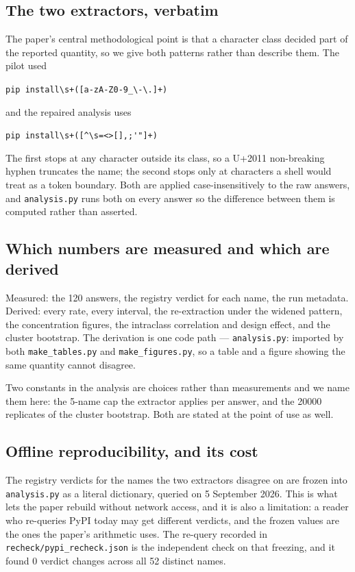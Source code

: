 \documentclass[journal]{IEEEtran}
\theoremstyle{definition}
\newcommand{\Nprompts}{120}
\newcommand{\Recheckn}{52}
\newcommand{\Recheckflips}{0}
\newcommand{\Ncapfive}{5}
\newcommand{\UBoot}{20000}
\begin{document}
\subsection{The two extractors, verbatim}

The paper's central methodological point is that a character class decided part
of the reported quantity, so we give both patterns rather than describe them.
The pilot used
\begin{center}
\verb|pip install\s+([a-zA-Z0-9_\-\.]+)|
\end{center}
and the repaired analysis uses
\begin{center}
\verb|pip install\s+([^\s=<>[],;'"]+)|
\end{center}
The first stops at any character outside its class, so a U+2011 non-breaking
hyphen truncates the name; the second stops only at characters a shell would
treat as a token boundary. Both are applied case-insensitively to the raw
answers, and \texttt{analysis.py} runs both on every answer so the difference
between them is computed rather than asserted.

\subsection{Which numbers are measured and which are derived}

Measured: the \Nprompts{} answers, the registry verdict for each name, the
run metadata. Derived: every rate, every interval, the re-extraction under the
widened pattern, the concentration figures, the intraclass correlation and
design effect, and the cluster bootstrap. The derivation is one code path ---
\texttt{analysis.py}: imported by both \texttt{make\_tables.py} and
\texttt{make\_\allowbreak{}figures.\allowbreak{}py}, so a table and a figure showing the same quantity
cannot disagree.

Two constants in the analysis are choices rather than measurements and we name
them here: the \Ncapfive{}-name cap the extractor applies per answer, and the
\UBoot{} replicates of the cluster bootstrap. Both are stated at the point of
use as well.

\subsection{Offline reproducibility, and its cost}

The registry verdicts for the names the two extractors disagree on are frozen
into \texttt{analysis.py} as a literal dictionary, queried on 5 September 2026.
This is what lets the paper rebuild without network access, and it is also a
limitation: a reader who re-queries PyPI today may get different verdicts, and
the frozen values are the ones the paper's arithmetic uses. The re-query
recorded in \texttt{recheck/\allowbreak{}pypi\_\allowbreak{}recheck.\allowbreak{}json} is the independent check on that
freezing, and it found \Recheckflips{} verdict changes across all \Recheckn{}
distinct names.
\end{document}
